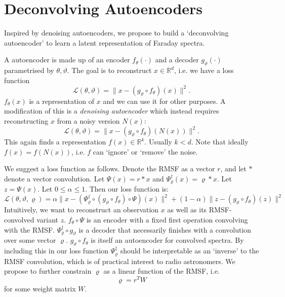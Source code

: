\documentclass[a4paper]{article}
\newcommand{\defn}[1]{\emph{#1}}
\begin{document}
    \section{Deconvolving Autoencoders}

        Inspired by denoising autoencoders, we propose to build a `deconvolving autoencoder' to learn a latent representation of Faraday spectra.

        A autoencoder is made up of an encoder $f_\theta(\cdot)$ and a decoder $g_\vartheta(\cdot)$ parametrised by $\theta, \vartheta$. The goal is to reconstruct $x \in \mathbb{R}^d$, i.e. we have a loss function
        \begin{equation}
            \mathcal L(\theta, \vartheta) = \|x - (g_\vartheta \circ f_\theta)(x)\|^2.
        \end{equation}
        $f_\theta(x)$ is a representation of $x$ and we can use it for other purposes. A modification of this is a \defn{denoising autoencoder} which instead requires reconstructing $x$ from a noisy version $N(x)$:
        \begin{equation}
            \mathcal L(\theta, \vartheta) =  \|x - (g_\vartheta \circ f_\theta)(N(x))\|^2.
        \end{equation}
        This again finds a representation $f(x) \in \mathbb{R}^k$. Usually $k < d$. Note that ideally $f(x) = f(N(x))$, i.e. $f$ can `ignore' or `remove' the noise.

        We suggest a loss function as follows. Denote the RMSF as a vector $r$, and let $\ast$ denote a vector convolution. Let $\Psi(x) = r \ast x$ and $\Psi^\dagger_\varrho(x) = \varrho \ast x$. Let $z = \Psi(x)$. Let $0 \leq \alpha \leq 1$. Then our loss function is:
        \begin{equation}
            \mathcal L(\theta, \vartheta, \varrho) = \alpha\|x - (\Psi^\dagger_\varrho \circ (g_\vartheta \circ f_\theta) \circ \Psi)(x)\|^2 + (1 - \alpha)\|z - (g_\vartheta \circ f_\theta)(z)\|^2
        \end{equation}
        Intuitively, we want to reconstruct an observation $x$ as well as its RMSF-convolved variant $z$. $f_\theta \circ \Psi$ is an encoder with a fixed first operation convolving with the RMSF. $\Psi^\dagger_\varrho \circ g_\vartheta$ is a decoder that necessarily finishes with a convolution over some vector $\varrho$. $g_\vartheta \circ f_\theta$ is itself an autoencoder for convolved spectra. By including this in our loss function $\Psi^\dagger_\varrho$ should be interpretable as an `inverse' to the RMSF convolution, which is of practical interest to radio astronomers. We propose to further constrain $\varrho$ as a linear function of the RMSF, i.e.
        \begin{equation}
            \varrho = r^T W
        \end{equation}
        for some weight matrix $W$.
\end{document}
